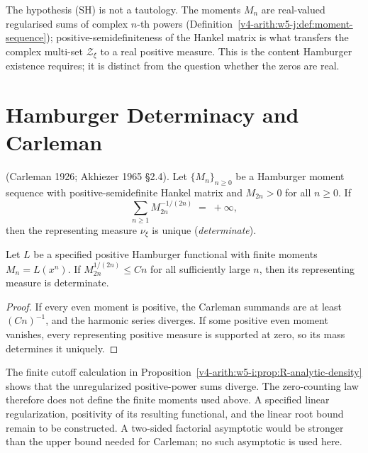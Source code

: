 \begin{remark}
\label{v4-arith:w5-j:rem:SH-arithmetic-input}
The hypothesis (SH) is not a tautology. The moments \(M_{n}\) are
real-valued regularised sums of complex \(n\)-th powers
(Definition~\ref{v4-arith:w5-j:def:moment-sequence}); positive-semidefiniteness
of the Hankel matrix is what transfers the complex multi-set
\(\mathcal{Z}_{\xi}\) to a real positive measure. This is the
content Hamburger existence requires; it is distinct from the
question whether the zeros are real.
\end{remark}

\section{Hamburger Determinacy and Carleman}
\label{v4-arith:w5-j:carleman-det}

\begin{theorem}
\label{v4-arith:w5-j:thm:carleman}
\ClaimStatusProvedElsewhere (Carleman 1926; Akhiezer 1965 \S2.4).
Let \(\{M_{n}\}_{n\geq 0}\) be a Hamburger moment sequence with
positive-semidefinite Hankel matrix and \(M_{2n}>0\) for all \(n\geq
0\). If
\begin{equation}
\label{v4-arith:w5-j:eq:carleman-sum}
\sum_{n\geq 1}M_{2n}^{-1/(2n)}\;=\;+\infty,
\end{equation}
then the representing measure \(\nu_{\xi}\) is unique
(\emph{determinate}).
\end{theorem}

\begin{proposition}
\label{v4-arith:w5-j:prop:carleman-RH-heuristic}
Let \(L\) be a specified positive Hamburger functional with finite
moments \(M_n=L(x^n)\). If \(M_{2n}^{1/(2n)}\leq Cn\) for all
sufficiently large \(n\), then its representing measure is determinate.
\end{proposition}
\begin{proof}
If every even moment is positive, the Carleman summands are at least
\((Cn)^{-1}\), and the harmonic series diverges. If some positive even
moment vanishes, every representing positive measure is supported at
zero, so its mass determines it uniquely.
\end{proof}
\begin{remark}
\label{v4-arith:w5-j:rem:heuristic-not-theorem}
The finite cutoff calculation in
Proposition~\ref{v4-arith:w5-i:prop:R-analytic-density} shows that the
unregularized positive-power sums diverge. The zero-counting law
therefore does not define the finite moments used above. A specified
linear regularization, positivity of its resulting functional, and
the linear root bound remain to be constructed. A two-sided factorial
asymptotic would be stronger than the upper bound needed for Carleman;
no such asymptotic is used here.
\end{remark}

